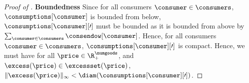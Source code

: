\begin{proof}[Proof of ]
    \textbf{Boundedness}
    Since for all consumers $\consumer \in \consumers$, $\consumptions[\consumer]$ is bounded from below, $\consumptions[\consumer][\prime]$ must be bounded as it is bounded from above by $\sum_{\consumer \in \consumers} \consendow[\consumer]$. Hence, for all consumers $\consumer \in \consumers$, $\consumptions[\consumer][\prime]$ is compact. Hence, we must have for all $\price \in \R^\numgoods_+$, and $\excess(\price) \in \excessset(\price)$, $\| \excess(\price)\|_\infty < \diam(\consumptions[\consumer][\prime])$.
\end{proof}